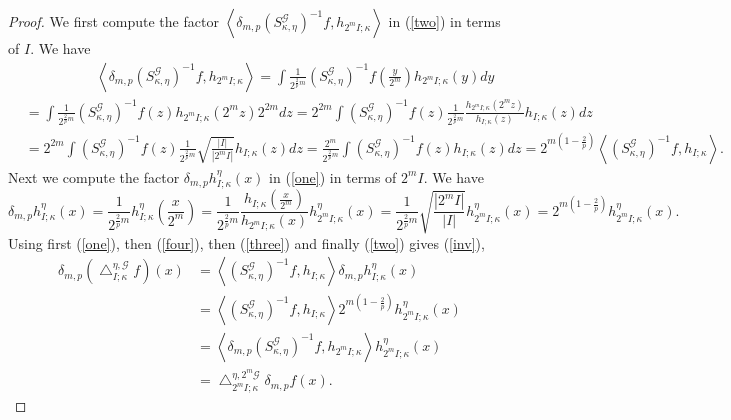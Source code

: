 \documentclass[10pt,a4paper]{amsart}
\begin{document}
\begin{proof}
We first compute the factor $\left\langle \delta_{m,p}\left(  S_{\kappa,\eta
}^{\mathcal{G}}\right)  ^{-1}f,h_{2^{m}I;\kappa}\right\rangle $ in (\ref{two})
in terms of $I$. We have%
\begin{align}
&  \ \ \ \ \ \ \ \ \ \ \ \ \ \ \ \ \ \ \ \ \ \ \ \left\langle \delta
_{m,p}\left(  S_{\kappa,\eta}^{\mathcal{G}}\right)  ^{-1}f,h_{2^{m}I;\kappa
}\right\rangle =\int\frac{1}{2^{\frac{2}{p}m}}\left(  S_{\kappa,\eta
}^{\mathcal{G}}\right)  ^{-1}f\left(  \frac{y}{2^{m}}\right)  h_{2^{m}%
I;\kappa}\left(  y\right)  dy\label{three}\\
&  =\int\frac{1}{2^{\frac{2}{p}m}}\left(  S_{\kappa,\eta}^{\mathcal{G}%
}\right)  ^{-1}f\left(  z\right)  h_{2^{m}I;\kappa}\left(  2^{m}z\right)
2^{2m}dz=2^{2m}\int\left(  S_{\kappa,\eta}^{\mathcal{G}}\right)  ^{-1}f\left(
z\right)  \frac{1}{2^{\frac{2}{p}m}}\frac{h_{2^{m}I;\kappa}\left(
2^{m}z\right)  }{h_{I;\kappa}\left(  z\right)  }h_{I;\kappa}\left(  z\right)
dz\nonumber\\
&  =2^{2m}\int\left(  S_{\kappa,\eta}^{\mathcal{G}}\right)  ^{-1}f\left(
z\right)  \frac{1}{2^{\frac{2}{p}m}}\sqrt{\frac{\left\vert I\right\vert
}{\left\vert 2^{m}I\right\vert }}h_{I;\kappa}\left(  z\right)  dz=\frac{2^{m}%
}{2^{\frac{2}{p}m}}\int\left(  S_{\kappa,\eta}^{\mathcal{G}}\right)
^{-1}f\left(  z\right)  h_{I;\kappa}\left(  z\right)  dz=2^{m\left(
1-\frac{2}{p}\right)  }\left\langle \left(  S_{\kappa,\eta}^{\mathcal{G}%
}\right)  ^{-1}f,h_{I;\kappa}\right\rangle .\nonumber
\end{align}
Next we compute the factor $\delta_{m,p}h_{I;\kappa}^{\eta}\left(  x\right)  $
in (\ref{one}) in terms of $2^{m}I$. We have%
\begin{equation}
\delta_{m,p}h_{I;\kappa}^{\eta}\left(  x\right)  =\frac{1}{2^{\frac{2}{p}m}%
}h_{I;\kappa}^{\eta}\left(  \frac{x}{2^{m}}\right)  =\frac{1}{2^{\frac{2}{p}%
m}}\frac{h_{I;\kappa}\left(  \frac{x}{2^{m}}\right)  }{h_{2^{m}I;\kappa
}\left(  x\right)  }h_{2^{m}I;\kappa}^{\eta}\left(  x\right)  =\frac
{1}{2^{\frac{2}{p}m}}\sqrt{\frac{\left\vert 2^{m}I\right\vert }{\left\vert
I\right\vert }}h_{2^{m}I;\kappa}^{\eta}\left(  x\right)  =2^{m\left(
1-\frac{2}{p}\right)  }h_{2^{m}I;\kappa}^{\eta}\left(  x\right)  .\label{four}%
\end{equation}
Using first (\ref{one}), then (\ref{four}), then (\ref{three}) and finally
(\ref{two}) gives (\ref{inv}),%
\begin{align*}
\delta_{m,p}\left(  \bigtriangleup_{I;\kappa}^{\eta,\mathcal{G}}f\right)
\left(  x\right)   &  =\left\langle \left(  S_{\kappa,\eta}^{\mathcal{G}%
}\right)  ^{-1}f,h_{I;\kappa}\right\rangle \delta_{m,p}h_{I;\kappa}^{\eta
}\left(  x\right) \\
&  =\left\langle \left(  S_{\kappa,\eta}^{\mathcal{G}}\right)  ^{-1}%
f,h_{I;\kappa}\right\rangle 2^{m\left(  1-\frac{2}{p}\right)  }h_{2^{m}%
I;\kappa}^{\eta}\left(  x\right) \\
&  =\left\langle \delta_{m,p}\left(  S_{\kappa,\eta}^{\mathcal{G}}\right)
^{-1}f,h_{2^{m}I;\kappa}\right\rangle h_{2^{m}I;\kappa}^{\eta}\left(  x\right)
\\
&  =\bigtriangleup_{2^{m}I;\kappa}^{\eta,2^{m}\mathcal{G}}\delta_{m,p}f\left(
x\right)  .
\end{align*}

\end{proof}
\end{document}
